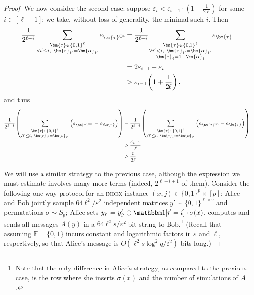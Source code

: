 \documentclass[10pt,a4paper]{article}
\theoremstyle{definition}
\newcommand{\field}{\mathbb{F}}
\newcommand{\eps}{\varepsilon}
\newcommand{\bitset}{\{0,1\}}
\newcommand{\indexproblem}{\normalfont\textsc{index}\xspace}
\newcommand{\pcommitlength}{p}
\newcommand{\pcommitstring}{y}
\newcommand{\fieldsize}{q}
\newcommand{\chf}{\mathbbm 1}
\def\fe#1{
    \ifnum#1=1
        \alpha
    \else
    \ifnum#1=2
        \beta
    \else
    \ifnum#1=3
        \gamma
    \fi\fi\fi
}
\begin{document}
\begin{proof}
    We now consider the second case: suppose $\eps_i < \eps_{i - 1} \cdot \left(1 - \frac1{2\ell}\right)$ for some $i \in [\ell - 1]$; we take, without loss of generality, the minimal such $i$. Then
    \begin{align*}
        \frac1{2^{\ell - i}} \sum_{\substack{\bm{\tau} \in \bitset^{\ell} \\ \forall i' \leq i, ~ \bm{\tau}_{i'} = \bm{\fe1}_{i'}}} \eps_{\bm{\tau}^{\oplus i}} &= \frac1{2^{\ell - i}} \sum_{\substack{\bm{\tau} \in \bitset^{\ell} \\ \forall i' < i, ~ \bm{\tau}_{i'} = \bm{\fe1}_{i'}\\\bm{\tau}_i = 1 - \bm{\fe1}_i}} \eps_{\bm{\tau}} \\
        &= 2 \eps_{i - 1} - \eps_i\\
        &> \eps_{i - 1} \left(1 + \frac1{2\ell}\right),
    \end{align*}
    and thus
    \begin{align*}
        \frac1{2^{\ell - i}} \left(\sum_{\substack{\bm{\tau} \in \bitset^{\ell} \\ \forall i' \leq i, ~ \bm{\tau}_{i'} = \bm{\fe1}_{i'}}} \left(\eps_{\bm{\tau}^{\oplus i}} - \eps_{\bm{\tau}}\right)\right) &= \frac1{2^{\ell - i}}\left(\sum_{\substack{\bm{\tau} \in \bitset^{\ell} \\ \forall i' \leq i, ~ \bm{\tau}_{i'} = \bm{\fe1}_{i'}}} \left(a_{\bm{\tau}^{\oplus i}} - a_{\bm{\tau}}\right)\right)\\
        &> \frac{\eps_{i - 1}}{\ell}\\
        &\geq \frac{\eps}{2 \ell}.
    \end{align*}
    
    We will use a similar strategy to the previous case, although the expression we must estimate involves many more terms (indeed, $2^{\ell - i + 1}$ of them). Consider the following one-way protocol for an \indexproblem instance $(x, j) \in \bitset^\pcommitlength \times [\pcommitlength]$: Alice and Bob jointly sample $64 \ell^2/\eps^2$ independent matrices $\pcommitstring' \sim \bitset^{\ell \times \pcommitlength}$ and permutations $\sigma \sim S_\pcommitlength$; Alice sets $\pcommitstring_{i'} = \pcommitstring'_{i'} \oplus \chf[i' = i] \cdot \sigma(x)$, computes and sends all messages $A(\pcommitstring)$ in a $64 \ell^2s/\eps^2$-bit string to Bob.\footnote{Note that the only difference in Alice's strategy, as compared to the previous case, is the row where she inserts $\sigma(x)$ and the number of simulations of $A$.} (Recall that assuming $\field = \bitset$ incurs constant and logarithmic factors in $\eps$ and $\ell$, respectively, so that Alice's message is $O(\ell^2 s \log^2 \fieldsize / \eps^2)$ bits long.)
    

\end{proof}
\end{document}
